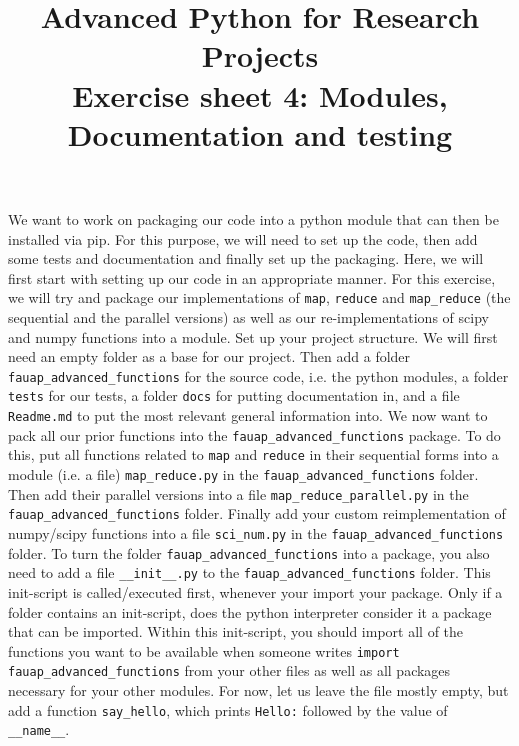 \documentclass[]{erlangen-problemset}
\title{{\Large Advanced Python for Research Projects} \\[0.3cm] 
Exercise sheet 4: Modules, Documentation and testing}
\begin{document}


\begin{problem}[title={Using files and directories as modules}]
    We want to work on packaging our code into a python module that can then be installed via pip. 
    For this purpose, we will need to set up the code, then add some tests and documentation and finally set up the packaging.
    Here, we will first start with setting up our code in an appropriate manner. 
    For this exercise, we will try and package our implementations of \texttt{map}, \texttt{reduce} and  \texttt{map\_reduce} (the sequential and the parallel versions) as well as our re-implementations of scipy and numpy functions into a module.
\noindent
\Question Set up your project structure. We will first need an empty folder as a base for our project. 
Then add a folder \texttt{fauap\_advanced\_functions} for the source code, i.e. the python modules, 
a folder \texttt{tests} for our tests,
a folder \texttt{docs} for putting documentation in,
and a file \texttt{Readme.md} to put the most relevant general information into.
\Question We now want to pack all our prior functions into the \texttt{fauap\_advanced\_functions} package. 
To do this, put all functions related to \texttt{map} and \texttt{reduce} in their sequential forms into a module (i.e. a file) \texttt{map\_reduce.py} in the \texttt{fauap\_advanced\_functions} folder. 
Then add their parallel versions into a file \texttt{map\_reduce\_parallel.py} in the \texttt{fauap\_advanced\_functions} folder. 
Finally add your custom reimplementation of numpy/scipy functions into a file \texttt{sci\_num.py} in the \texttt{fauap\_advanced\_functions} folder. 
To turn the folder \texttt{fauap\_advanced\_functions} into a package, you also need to add a file \texttt{\_\_init\_\_.py} to the \texttt{fauap\_advanced\_functions} folder.
This init-script is called/executed first, whenever your import your package. 
Only if a folder contains an init-script, does the python interpreter consider it a package that can be imported. 
Within this init-script, you should import all of the functions you want to be available when someone writes \texttt{import fauap\_advanced\_functions} from your other files as well as all packages necessary for your other modules.
For now, let us leave the file mostly empty, but add a function \texttt{say\_hello}, which prints \texttt{Hello:} followed by the value of \texttt{\_\_name\_\_}. 

\end{problem}
\end{document}
